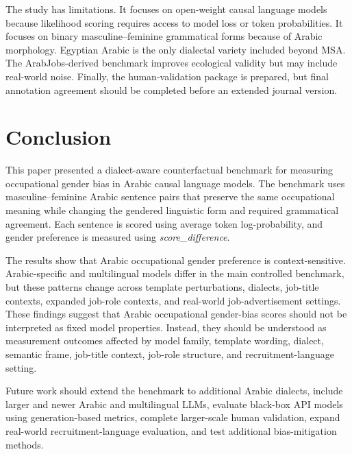 \documentclass[conference]{IEEEtran}
\begin{document}
The study has limitations. It focuses on open-weight causal language models because likelihood scoring requires access to model loss or token probabilities. It focuses on binary masculine--feminine grammatical forms because of Arabic morphology. Egyptian Arabic is the only dialectal variety included beyond MSA. The ArabJobs-derived benchmark improves ecological validity but may include real-world noise. Finally, the human-validation package is prepared, but final annotation agreement should be completed before an extended journal version.

\section{Conclusion}

This paper presented a dialect-aware counterfactual benchmark for measuring occupational gender bias in Arabic causal language models. The benchmark uses masculine--feminine Arabic sentence pairs that preserve the same occupational meaning while changing the gendered linguistic form and required grammatical agreement. Each sentence is scored using average token log-probability, and gender preference is measured using \textit{score\_difference}.

The results show that Arabic occupational gender preference is context-sensitive. Arabic-specific and multilingual models differ in the main controlled benchmark, but these patterns change across template perturbations, dialects, job-title contexts, expanded job-role contexts, and real-world job-advertisement settings. These findings suggest that Arabic occupational gender-bias scores should not be interpreted as fixed model properties. Instead, they should be understood as measurement outcomes affected by model family, template wording, dialect, semantic frame, job-title context, job-role structure, and recruitment-language setting.

Future work should extend the benchmark to additional Arabic dialects, include larger and newer Arabic and multilingual LLMs, evaluate black-box API models using generation-based metrics, complete larger-scale human validation, expand real-world recruitment-language evaluation, and test additional bias-mitigation methods.
\end{document}

